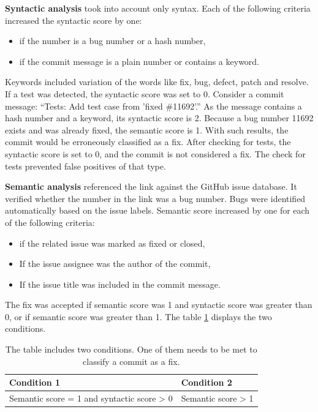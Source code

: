 \textbf{Syntactic analysis} took into account only syntax. Each of the following criteria increased the syntactic score by one:
\begin{itemize}
  \item if the number is a bug number or a hash number,
  \item if the commit message is a plain number or contains a keyword.
\end{itemize}

Keywords included variation of the words like fix, bug, defect, patch and resolve. If a test was detected, the syntactic score was set to 0. Consider a commit message: “Tests: Add test case from 'fixed \#11692'.” As the message contains a hash number and a keyword, its syntactic score is 2. Because a bug number 11692 exists and was already fixed, the semantic score is 1. With such results, the commit would be erroneously classified as a fix. After checking for tests, the syntactic score is set to 0, and the commit is not considered a fix. The check for tests prevented false positives of that type.  \par

\textbf{Semantic analysis} referenced the link against the GitHub issue database. It verified whether the number in the link was a bug number. Bugs were identified automatically based on the issue labels. Semantic score increased by one for each of the following criteria:
\begin{itemize}
  \item if the related issue was marked as fixed or closed,
  \item If the issue assignee was the author of the commit, 
  \item If the issue title was included in the commit message.
\end{itemize}
The fix was accepted if semantic score was 1 and syntactic score was greater than 0, or if semantic score was greater than 1. The table \ref{table:2} displays the two conditions.

\begin{table}[h!]
\begin{center}
\begin{tabular}{ | m{19em} | m{18em}| } 
\hline
Condition 1 & Condition 2 \\ 
\hline \hline
Semantic score = 1 and syntactic score > 0 & Semantic score > 1 \\ 
\hline
\end{tabular}
\end{center}
\caption[Fix Acceptance Conditions]{The table includes two conditions. One of them needs to be met to classify a commit as a fix.}
\label{table:2}
\end{table}

